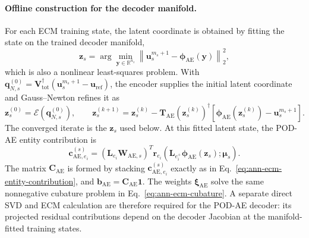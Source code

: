 \documentclass[11pt]{article}
\begin{document}
\paragraph{Offline construction for the decoder manifold.}
For each ECM training state, the latent coordinate is obtained by fitting the
state on the trained decoder manifold,
\begin{equation}
\mathbf z_s
=
\arg\min_{\mathbf y\in\mathbb R^{n_z}}
\left\|
\mathbf u_s^{m_s+1}
-\boldsymbol\phi_{\mathrm{AE}}(\mathbf y)
\right\|_2^2,
\label{eq:podae-ecm-manifold-fit}
\end{equation}
which is also a nonlinear least-squares problem.  With
$\mathbf q_{N,s}^{(0)}=\mathbf V_{\mathrm{tot}}^{\dagger}
(\mathbf u_s^{m_s+1}-\mathbf u_{\mathrm{ref}})$, the encoder supplies the
initial latent coordinate and Gauss--Newton refines it as
\begin{equation}
\mathbf z_s^{(0)}=\mathcal E(\mathbf q_{N,s}^{(0)}),
\qquad
\mathbf z_s^{(k+1)}
=\mathbf z_s^{(k)}
-\mathbf T_{\mathrm{AE}}\!\left(\mathbf z_s^{(k)}\right)^{\dagger}
\left[
\boldsymbol\phi_{\mathrm{AE}}\!\left(\mathbf z_s^{(k)}\right)
-\mathbf u_s^{m_s+1}
\right].
\label{eq:podae-ecm-nonlinear-fit-update}
\end{equation}
The converged iterate is the $\mathbf z_s$ used below. At this fitted latent
state, the POD-AE entity contribution is
\begin{equation}
\mathbf c_{\mathrm{AE},e_i}^{(s)}
=
\left(\mathbf L_{e_i}\mathbf W_{\mathrm{AE},s}\right)^T
\mathbf r_{e_i}
\!\left(\mathbf L_{e_i^+}\boldsymbol\phi_{\mathrm{AE}}(\mathbf z_s);\bm\mu_s\right).
\label{eq:podae-ecm-entity-contribution}
\end{equation}
The matrix $\mathbf C_{\mathrm{AE}}$ is formed by stacking
$\mathbf c_{\mathrm{AE},e_i}^{(s)}$ exactly as in
Eq.~\eqref{eq:ann-ecm-entity-contribution}, and
$\mathbf b_{\mathrm{AE}}=\mathbf C_{\mathrm{AE}}\mathbf1$. The weights
$\boldsymbol\xi_{\mathrm{AE}}$ solve the same nonnegative cubature problem
in Eq.~\eqref{eq:ann-ecm-cubature}. A separate direct SVD and ECM calculation
are therefore required for the POD-AE decoder: its projected residual
contributions depend on the decoder Jacobian at the manifold-fitted training
states.
\end{document}
